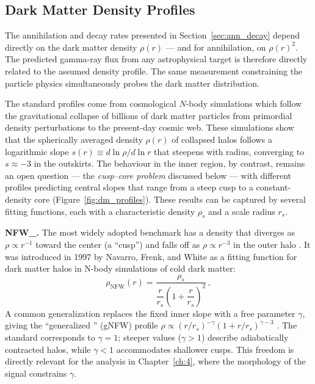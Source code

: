 \subsection{Dark Matter Density Profiles}
\label{sec:density_profiles}

The annihilation and decay rates presented in Section~\ref{sec:ann_decay} depend directly on the dark matter density $\rho(r)$ --- and for annihilation, on $\rho(r)^2$.
The predicted gamma-ray flux from any astrophysical target is therefore directly related to the assumed density profile.
The same measurement constraining the particle physics simultaneously probes the dark matter distribution.

The standard profiles come from cosmological $N$-body simulations which follow the gravitational collapse of billions of dark matter particles from primordial density perturbations to the present-day cosmic web.
These simulations show that the spherically averaged density $\rho(r)$ of collapsed halos follows a logarithmic slope $s(r) \equiv d\ln\rho / d\ln r$ that steepens with radius, converging to $s \approx -3$ in the outskirts.
The behaviour in the inner region, by contrast, remains an open question --- the \textit{cusp--core problem} discussed below --- with different profiles predicting central slopes that range from a steep cusp to a constant-density core (Figure~\ref{fig:dm_profiles}).
These results can be captured by several fitting functions, each with a characteristic density $\rho_s$ and a scale radius $r_s$.

\textbf{\Gls{NFW_}.}
The most widely adopted benchmark has a density that diverges as $\rho \propto r^{-1}$ toward the center (a ``cusp'') and falls off as $\rho \propto r^{-3}$ in the outer halo \cite{Navarro:1996gj}. It was introduced in 1997 by Navarro, Frenk, and White as a fitting function for dark matter halos in N-body simulations of cold dark matter:
%
\begin{equation}
	\rho_\text{NFW}(r) = \frac{\rho_s}{\dfrac{r}{r_s}\left(1 + \dfrac{r}{r_s}\right)^2} \,,
	\label{eq:nfw}
\end{equation}
%
A common generalization replaces the fixed inner slope with a free parameter $\gamma$, giving the ``generalized \NFW'' (gNFW) profile $\rho \propto (r/r_s)^{-\gamma}(1 + r/r_s)^{\gamma - 3}$ \cite{Cirelli:2024ssz}.
The standard \NFW corresponds to $\gamma = 1$; steeper values ($\gamma > 1$) describe adiabatically contracted halos, while $\gamma < 1$ accommodates shallower cusps.
This freedom is directly relevant for the \GCE analysis in Chapter~\ref{ch:4}, where the morphology of the signal constrains $\gamma$.

